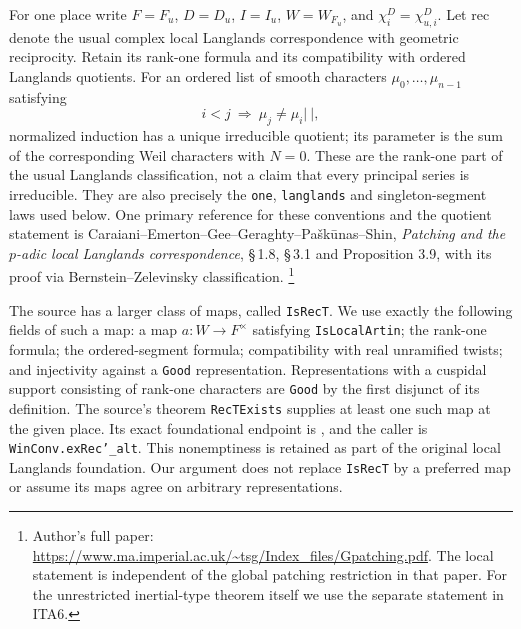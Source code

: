 For one place write $F=F_u$, $D=D_u$, $I=I_u$, $W=W_{F_u}$,
and $\chi_i^D=\chi^D_{u,i}$.  Let $\mathrm{rec}$ denote
the usual complex local Langlands correspondence with geometric
reciprocity.  Retain its rank-one formula and its compatibility
with ordered Langlands quotients.  For an ordered list of smooth
characters $\mu_0,\ldots,\mu_{n-1}$ satisfying
\[
                  i<j\ \Longrightarrow\ \mu_j\ne\mu_i|\ |,
                                                               \tag{ITA.8}
\]
normalized induction has a unique irreducible quotient; its
parameter is the sum of the corresponding Weil characters with
$N=0$.  These are the rank-one part of the usual Langlands
classification, not a claim that every principal series is
irreducible.  They are also precisely the \texttt{one},
\texttt{langlands} and singleton-segment laws used below.
One primary reference for these conventions and the quotient
statement is Caraiani--Emerton--Gee--Geraghty--Pa\v{s}k\={u}nas--Shin,
\emph{Patching and the $p$-adic local Langlands correspondence},
\S\,1.8, \S\,3.1 and Proposition 3.9, with its proof via
Bernstein--Zelevinsky classification.
\footnote{Author's full paper:
\url{https://www.ma.imperial.ac.uk/~tsg/Index_files/Gpatching.pdf}.
The local statement is independent of the global patching
restriction in that paper.  For the unrestricted inertial-type
theorem itself we use the separate statement in ITA6.}

The source has a larger class of maps, called \texttt{IsRecT}.
We use exactly the following fields of such a map: a map
$a:W\to F^\times$ satisfying \texttt{IsLocalArtin}; the
rank-one formula; the ordered-segment formula; compatibility
with real unramified twists; and injectivity against a
\texttt{Good} representation.  Representations with a
cuspidal support consisting of rank-one characters are
\texttt{Good} by the first disjunct of its definition.
The source's theorem \texttt{RecTExists} supplies at least
one such map at the given place.  Its exact foundational
endpoint is
,
and the caller is \texttt{WinConv.exRec'\_alt}.  This
nonemptiness is retained as part of the original local
Langlands foundation.  Our argument does not replace
\texttt{IsRecT} by a preferred map or assume its maps agree
on arbitrary representations.

